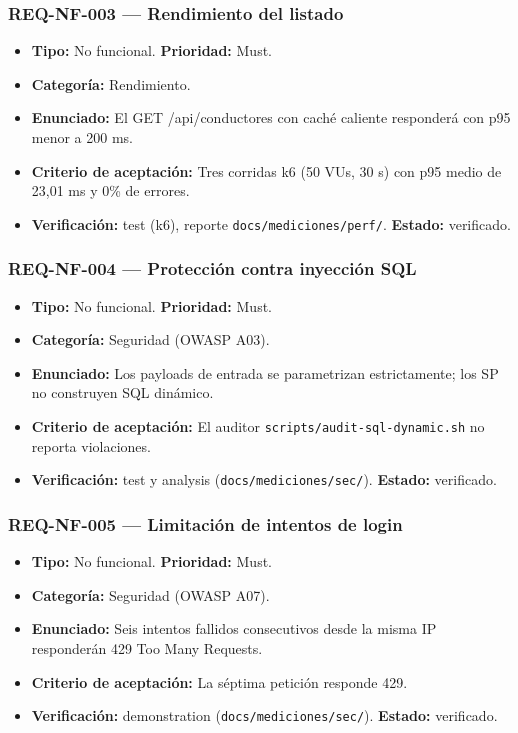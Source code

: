 \documentclass[12pt,a4paper]{article}
\begin{document}
\subsubsection{REQ-NF-003 --- Rendimiento del listado}
\begin{itemize}
  \item \textbf{Tipo:} No funcional. \textbf{Prioridad:} Must.
  \item \textbf{Categoría:} Rendimiento.
  \item \textbf{Enunciado:} El GET /api/conductores con caché caliente responderá con p95 menor a 200 ms.
  \item \textbf{Criterio de aceptación:} Tres corridas k6 (50 VUs, 30 s) con p95 medio de 23,01 ms y 0\% de errores.
  \item \textbf{Verificación:} test (k6), reporte \texttt{docs/mediciones/perf/}. \textbf{Estado:} verificado.
\end{itemize}

\subsubsection{REQ-NF-004 --- Protección contra inyección SQL}
\begin{itemize}
  \item \textbf{Tipo:} No funcional. \textbf{Prioridad:} Must.
  \item \textbf{Categoría:} Seguridad (OWASP A03).
  \item \textbf{Enunciado:} Los payloads de entrada se parametrizan estrictamente; los SP no construyen SQL dinámico.
  \item \textbf{Criterio de aceptación:} El auditor \texttt{scripts/audit-sql-dynamic.sh} no reporta violaciones.
  \item \textbf{Verificación:} test y analysis (\texttt{docs/mediciones/sec/}). \textbf{Estado:} verificado.
\end{itemize}

\subsubsection{REQ-NF-005 --- Limitación de intentos de login}
\begin{itemize}
  \item \textbf{Tipo:} No funcional. \textbf{Prioridad:} Must.
  \item \textbf{Categoría:} Seguridad (OWASP A07).
  \item \textbf{Enunciado:} Seis intentos fallidos consecutivos desde la misma IP responderán 429 Too Many Requests.
  \item \textbf{Criterio de aceptación:} La séptima petición responde 429.
  \item \textbf{Verificación:} demonstration (\texttt{docs/mediciones/sec/}). \textbf{Estado:} verificado.
\end{itemize}
\end{document}
